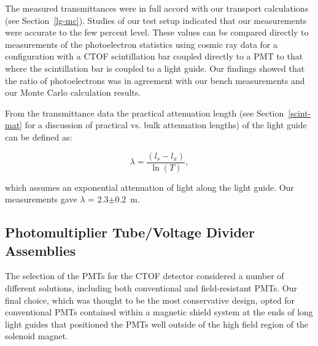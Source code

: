 \documentclass[3p,times,twocolumn]{elsarticle}
\begin{document}
The measured transmittances were in full accord with our transport calculations (see Section~\ref{lg-mc}).
Studies of our test setup indicated that our measurements were accurate to the few percent level. These
values can be compared directly to measurements of the photoelectron statistics using cosmic ray data for
a configuration with a CTOF scintillation bar coupled directly to a PMT to that where the scintillation bar is
coupled to a light guide. Our findings showed that the ratio of photoelectrons was in agreement with our
bench measurements and our Monte Carlo calculation results.

From the transmittance data the practical attenuation length (see Section~\ref{scint-mat} for a discussion
of practical vs. bulk attenuation lengths) of the light guide can be defined as:

\begin{equation}
\label{pracat}
\lambda= \frac{(l_s-l_x)}{\ln(T)},
\end{equation}

\noindent
which assumes an exponential attenuation of light along the light guide. Our measurements gave
$\lambda$ = 2.3$\pm$0.2~m.

\subsection{Photomultiplier Tube/Voltage Divider Assemblies} 
\label{PMTs}

The selection of the PMTs for the CTOF detector considered a number of different solutions, including
both conventional and field-resistant PMTs. Our final choice, which was thought to be the most conservative
design, opted for conventional PMTs contained within a magnetic shield system at the ends of long light
guides that positioned the PMTs well outside of the high field region of the solenoid magnet.
\end{document}
